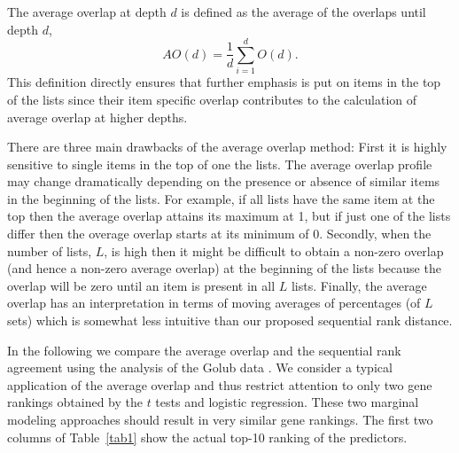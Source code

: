 \documentclass[12pt,a4paper]{article}
\theoremstyle{plain}
\begin{document}
The average overlap at depth $d$ is defined as the average of the
overlaps until depth $d$,
\begin{equation}
AO(d) = \frac1d\sum_{i=1}^d O(d).
\end{equation}
This definition directly ensures that further emphasis is put on items
in the top of the lists since their item specific overlap contributes
to the calculation of average overlap at higher depths.

There are three main drawbacks of the average overlap method: First it
is highly sensitive to single items in the top of one the lists.  The
average overlap profile may change dramatically depending on the
presence or absence of similar items in the beginning of the
lists. For example, if all lists have the same item at the top then
the average overlap attains its maximum at 1, but if just one of the
lists differ then the overage overlap starts at its minimum of
0. Secondly, when the number of lists, $L$, is high then it might be
difficult to obtain a non-zero overlap (and hence a non-zero average
overlap) at the beginning of the lists because the overlap will be
zero until an item is present in all $L$ lists. Finally, the average
overlap has an interpretation in terms of moving averages of
percentages (of $L$ sets) which is somewhat less intuitive than our
proposed sequential rank distance.

In the following we compare the average overlap and the sequential
rank agreement using the analysis of the Golub data
\citep{Golub1999}. We consider a typical application of the average
overlap and thus restrict attention to only two gene rankings obtained
by the $t$ tests and logistic regression. These two marginal modeling
approaches should result in very similar gene rankings. The first two
columns of Table~\ref{tab1} show the actual top-10 ranking of the
predictors.
\end{document}
